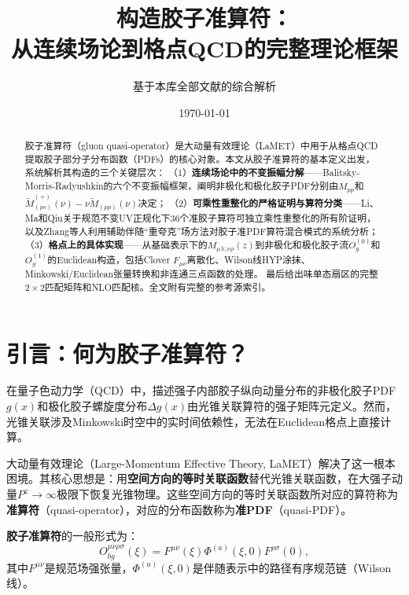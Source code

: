 \documentclass[12pt,a4paper]{ctexart}
\title{\heiti 构造胶子准算符：\\
从连续场论到格点QCD的完整理论框架}
\author{基于本库全部文献的综合解析}
\date{\today}
\theoremstyle{definition}
\begin{document}
\maketitle

\begin{abstract}
\noindent
胶子准算符（gluon quasi-operator）是大动量有效理论（LaMET）中用于从格点QCD提取胶子部分子分布函数（PDFs）的核心对象。本文从胶子准算符的基本定义出发，系统解析其构造的三个关键层次：
（1）\textbf{连续场论中的不变振幅分解}——Balitsky-Morris-Radyushkin的六个不变振幅框架，阐明非极化和极化胶子PDF分别由$M_{pp}$和$\tilde{M}_{(ps)}^{(+)}(\nu)-\nu\tilde{M}_{(pp)}(\nu)$决定；
（2）\textbf{可乘性重整化的严格证明与算符分类}——Li、Ma和Qiu关于规范不变UV正规化下36个准胶子算符可独立乘性重整化的所有阶证明，以及Zhang等人利用辅助伴随``重夸克''场方法对胶子准PDF算符混合模式的系统分析；
（3）\textbf{格点上的具体实现}——从基础表示下的$M_{\mu\lambda;\nu\rho}(z)$到非极化和极化胶子流$O^{(0)}_g$和$O^{(1)}_g$的Euclidean构造，包括Clover $F_{\mu\nu}$离散化、Wilson线HYP涂抹、Minkowski/Euclidean张量转换和非连通三点函数的处理。
最后给出味单态扇区的完整$2\times2$匹配矩阵和NLO匹配核。全文附有完整的参考源索引。
\end{abstract}

\tableofcontents
\newpage

\section{引言：何为胶子准算符？}

在量子色动力学（QCD）中，描述强子内部胶子纵向动量分布的非极化胶子PDF $g(x)$和极化胶子螺旋度分布$\Delta g(x)$由光锥关联算符的强子矩阵元定义。然而，光锥关联涉及Minkowski时空中的实时间依赖性，无法在Euclidean格点上直接计算。

大动量有效理论（Large-Momentum Effective Theory, LaMET）\cite{Ji2013, Ji2014LaMET}解决了这一根本困境。其核心思想是：用\textbf{空间方向的等时关联函数}替代光锥关联函数，在大强子动量$P^z \to \infty$极限下恢复光锥物理。这些空间方向的等时关联函数所对应的算符称为\textbf{准算符}（quasi-operator），对应的分布函数称为\textbf{准PDF}（quasi-PDF）。

\textbf{胶子准算符}的一般形式为\cite{Zhang2019,Li2018multiplicative}：
\begin{equation}
O^{\mu\nu\rho\sigma}_{bg}(\xi) = F^{\mu\nu}(\xi) \Phi^{(a)}(\xi, 0) F^{\rho\sigma}(0),
\label{eq:general_gluon_op}
\end{equation}
其中$F^{\mu\nu}$是规范场强张量，$\Phi^{(a)}(\xi, 0)$是伴随表示中的路径有序规范链（Wilson线）。
\end{document}

